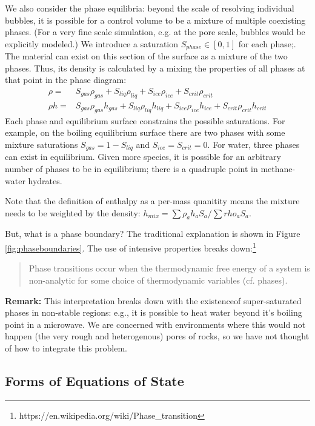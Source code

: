 \documentclass[]{article}
\begin{document}
We also consider the phase equilibria: beyond the scale of resolving
individual bubbles, it is possible
for a control volume to be a mixture of multiple coexisting
phases.
(For a very fine scale simulation, e.g. at the pore scale, bubbles
would be explicitly modeled.)
We introduce a saturation $S_{phase}\in[0,1]$ for each phase;.
The material can exist on this section of the surface as a mixture of
the two phases. Thus, its density is calculated by a mixing the
properties of all phases at that point in the phase diagram:
\begin{align}
  \rho = & S_{gas} \rho_{gas} + S_{liq} \rho_{liq} + S_{ice}
  \rho_{ice} + S_{crit} \rho_{crit} \\
  \rho h =& S_{gas} \rho_{gas} h_{gas} + S_{liq} \rho_{liq} h_{liq} + S_{ice}
  \rho_{ice} h_{ice} + S_{crit} \rho_{crit} h_{crit}
\end{align}
Each phase
and equilibrium surface constrains the possible saturations. For example, on the boiling equilibrium surface there are two phases with some mixture
saturations \(S_{gas}=1-S_{liq}\) and $S_{ice}=S_{crit}=0$. 
For water, three phases can exist in equilibrium. Given more species, it is possible for an arbitrary number of phases
to be in equilibrium; there is a quadruple point in methane-water
hydrates.

Note that the definition of enthalpy as a per-mass quanitity means the mixture needs to be weighted by the
density: $h_{mix}=\sum{\rho_a h_aS_a}/\sum{rho_aS_a}$.

But, what is a phase boundary? The traditional explanation is shown in
Figure \ref{fig:phaseboundaries}. The use of intensive properties breaks down:\footnote{https://en.wikipedia.org/wiki/Phase\_transition}

\begin{quote}
Phase transitions occur when the thermodynamic free energy of a system
is non-analytic for some choice of thermodynamic variables (cf. phases).
\end{quote}


{\bf Remark:} This interpretation breaks down with the existenceof super-saturated phases in non-stable regions: e.g., it is possible to
heat water beyond it's boiling point in a microwave. We are concerned
with environments where this would not happen (the very rough and
heterogenous) pores of rocks, so we have not thought of how to
integrate this problem.

\subsection{Forms of Equations of State}
\end{document}
